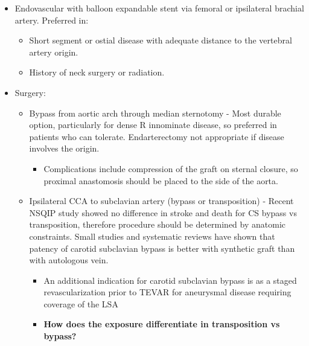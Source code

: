 \documentclass[
]{book}
\providecommand{\tightlist}{%
  \setlength{\itemsep}{0pt}\setlength{\parskip}{0pt}}
\begin{document}
\begin{itemize}
\item
  Endovascular with balloon expandable stent via femoral or
  ipsilateral brachial artery.
  \citep{chatterjeeAngioplastyAloneAngioplasty2013, bradaricEndovascularTherapyStenoOcclusive2015, sahaSubclavianArteryDisease2017, palchik2008, mordasini2011}
  Preferred in:

  \begin{itemize}
  \item
    Short segment or ostial disease with adequate distance to the
    vertebral artery origin.
  \item
    History of neck surgery or radiation.
  \end{itemize}
\item
  Surgery:

  \begin{itemize}
  \item
    Bypass from aortic arch through median sternotomy - Most durable
    option, particularly for dense R innominate disease, so
    preferred in patients who can tolerate. Endarterectomy not
    appropriate if disease involves the origin.\citep{aiello2011, mansukhani2018, berguer1998, daniel2014, reul1991, berguer1999, byrne2007}

    \begin{itemize}
    \tightlist
    \item
      Complications include compression of the graft on sternal
      closure, so proximal anastomosis should be placed to the
      side of the aorta.
    \end{itemize}
  \item
    Ipsilateral CCA to subclavian artery (bypass or transposition) -
    Recent NSQIP study showed no difference in stroke and death for
    CS bypass vs transposition, therefore procedure should be
    determined by anatomic constraints.\citep{cinà2002, vandervliet1995}
    Small studies and systematic reviews have shown that patency of
    carotid subclavian bypass is better with synthetic graft than
    with autologous vein.\citep{aburahma2000, illuminati2018, ziomek1986}

    \begin{itemize}
    \item
      An additional indication for carotid subclavian bypass is as
      a staged revascularization prior to TEVAR for aneurysmal
      disease requiring coverage of the LSA
    \item
      \textbf{How does the exposure differentiate in transposition vs
      bypass?}


\end{itemize}
\end{itemize}
\end{itemize}
\end{document}
